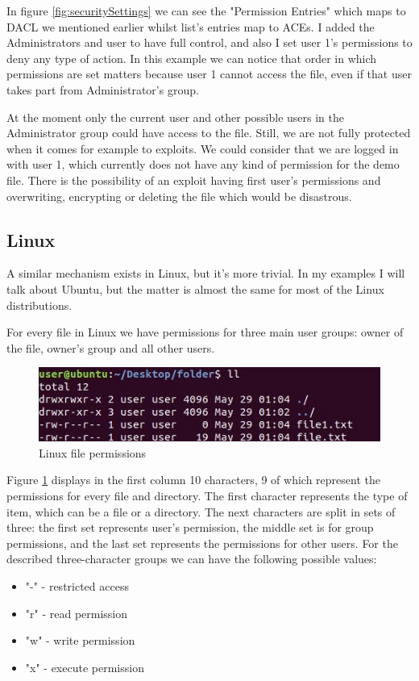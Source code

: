 	In figure \ref{fig:securitySettings} we can see the "Permission Entries" which maps to DACL we mentioned earlier whilst list's entries map to ACEs. I added the Administrators and user to have full control, and also I set user 1's permissions to deny any type of action. In this example we can notice that order in which permissions are set matters because user 1 cannot access the file, even if that user takes part from Administrator's group. 
	
	At the moment only the current user and other possible users in the Administrator group could have access to the file. Still, we are not fully protected when it comes for example to exploits. We could consider that we are logged in with user 1, which currently does not have any kind of permission for the demo file. There is the possibility of an exploit having first user's permissions and overwriting, encrypting or deleting the file which would be disastrous.
	
	\subsection{Linux}
	A similar mechanism exists in Linux, but it's more trivial. In my examples I will talk about Ubuntu, but the matter is almost the same for most of the Linux distributions.
	
	For every file in Linux we have permissions for three main user groups: owner of the file, owner's group and all other users. 
	
	\begin{figure}[h!]
		\includegraphics[width=\linewidth]{images/linuxFilePermissions.jpg}
		\caption{Linux file permissions}
		\label{fig:linuxFilePermissions}
	\end{figure}

	Figure \ref{fig:linuxFilePermissions} displays in the first column 10 characters, 9 of which represent the permissions for every file and directory. The first character represents the type of item, which can be a file or a directory. The next characters are split in sets of three: the first set represents user's permission, the middle set is for group permissions, and the last set represents the permissions for other users. For the described three-character groups we can have the following possible values:
	\begin{itemize}
		\item "-" - restricted access
		\item "r" - read permission
		\item "w" - write permission
		\item "x" - execute permission
	\end{itemize}
	
